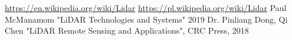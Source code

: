 \documentclass{thesis}
\begin{document}

\newpage
\tableofcontents
\newpage





\begin{thebibliography}{10}
 \url{https://en.wikipedia.org/wiki/Lidar}
 \url{https://pl.wikipedia.org/wiki/Lidar}
 Paul McManamom "LiDAR Technologies and Systems" 2019
 Dr. Pinliang Dong, Qi Chen "LiDAR Remote Sensing and Applications", CRC Press, 2018
\end{thebibliography}
\end{document}
